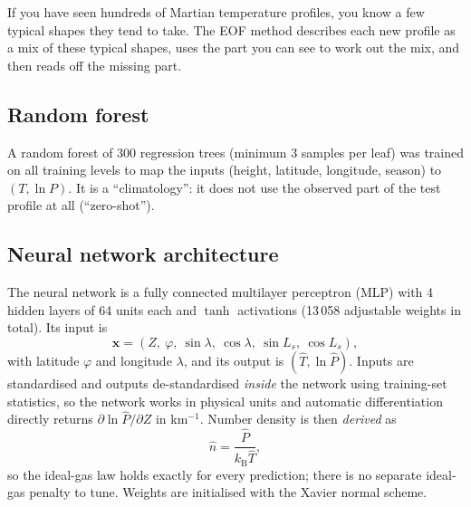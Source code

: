 \documentclass[11pt,a4paper]{article}
\newcommand{\kB}{k_{\mathrm{B}}}
\begin{document}
\begin{plainbox}
If you have seen hundreds of Martian temperature profiles, you know a few typical shapes they tend to take. The EOF method describes each new profile as a mix of these typical shapes, uses the part you can see to work out the mix, and then reads off the missing part.
\end{plainbox}

\subsection{Random forest}
A random forest \citep{breiman2001} of 300 regression trees (minimum 3 samples per leaf) was trained on all training levels to map the inputs (height, latitude, longitude, season) to $(T,\ln P)$. It is a ``climatology'': it does not use the observed part of the test profile at all (``zero-shot'').

\subsection{Neural network architecture}\label{sec:nn}
The neural network is a fully connected multilayer perceptron (MLP) with 4 hidden layers of 64 units each and $\tanh$ activations (13\,058 adjustable weights in total). Its input is
\begin{equation}
\mathbf{x} = (Z,\ \varphi,\ \sin\lambda,\ \cos\lambda,\ \sin L_s,\ \cos L_s),
\end{equation}
with latitude $\varphi$ and longitude $\lambda$, and its output is $(\hat T, \ln\hat P)$. Inputs are standardised and outputs de-standardised \emph{inside} the network using training-set statistics, so the network works in physical units and automatic differentiation directly returns $\partial\ln\hat P/\partial Z$ in km$^{-1}$. Number density is then \emph{derived} as
\begin{equation}
\hat n = \frac{\hat P}{\kB\hat T},
\end{equation}
so the ideal-gas law holds exactly for every prediction; there is no separate ideal-gas penalty to tune. Weights are initialised with the Xavier normal scheme.
\end{document}
